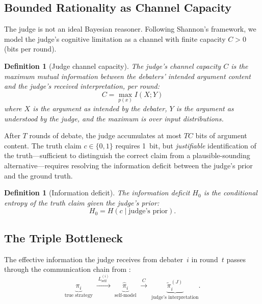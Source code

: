 \documentclass[11pt,a4paper]{article}
\newtheorem{definition}[theorem]{Definition}
\newcommand{\Lself}{L_{\text{self}}}
\begin{document}
\subsection{Bounded Rationality as Channel Capacity}

The judge is not an ideal Bayesian reasoner. Following Shannon's
framework, we model the judge's cognitive limitation as a channel
with finite capacity $C > 0$ (bits per round).

\begin{definition}[Judge channel capacity]
\label{def:judge-capacity}
The judge's channel capacity $C$ is the maximum mutual information
between the debaters' intended argument content and the judge's
received interpretation, per round:
\begin{equation}\label{eq:judge-capacity}
    C = \max_{p(x)} I(X; Y)
\end{equation}
where $X$ is the argument as intended by the debater, $Y$ is the
argument as understood by the judge, and the maximum is over input
distributions.
\end{definition}

After $T$ rounds of debate, the judge accumulates at most $TC$ bits
of argument content. The truth claim $c \in \{0, 1\}$ requires 1~bit,
but \emph{justifiable} identification of the truth---sufficient to
distinguish the correct claim from a plausible-sounding
alternative---requires resolving the information deficit between the
judge's prior and the ground truth.

\begin{definition}[Information deficit]
The information deficit $H_0$ is the conditional entropy of the truth
claim given the judge's prior:
\begin{equation}
    H_0 = H(c \mid \text{judge's prior}).
\end{equation}
\end{definition}

\subsection{The Triple Bottleneck}

The effective information the judge receives from debater~$i$ in round~$t$
passes through the communication chain from \cite{shcherbinin2026coop}:
\begin{equation}
    \underbrace{\pi_i}_{\text{true strategy}}
    \;\xrightarrow{\;\Lself^{(i)}\;}\;
    \underbrace{\hat{\pi}_i}_{\text{self-model}}
    \;\xrightarrow{\;C\;}\;
    \underbrace{\tilde{\pi}_i^{(J)}}_{\text{judge's interpretation}}.
\end{equation}
\end{document}
